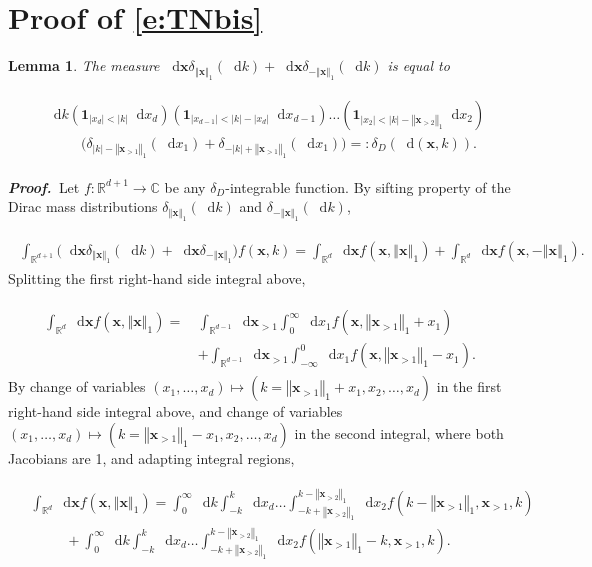 \documentclass[11pt,A4,twoside]{article}
\newcommand\ind{\mathbf{1}}
\numberwithin{equation}{section}
\renewcommand{\b}[1]{{\color{blue}#1}}
\renewcommand{\vec}{\mathbf}
\renewcommand*\d{\mathop{}\!\mathrm{d}}
\newcommand{\norml}[1]{\left\Vert#1 \right\Vert_{1}}
\newcommand{\x}{\mathbf{x}}
\newcommand{\z}{\mathbf{z}}
\newcommand{\R}{\mathbbm{R}}
\def\qqq{\;\;\;\;\;\;\;\;\;}
\newcommand{\beqa}{\begin{eqnarray}}
\newcommand{\eeqa}{\end{eqnarray}}
\def\bal{\begin{aligned}}
\def\eal{\end{aligned}}
\def\bll#1{
\beqa\label{#1}\bal
}\def\lel{\eal\eeqa}
\newcommand{\beql}[1]{\bll{#1}}
\newcommand{\eeql}{\lel}
\newtheorem{lemma}[theorem]{Lemma}
\theoremstyle{definition}
\theoremstyle{remark}
\def\z{\vec z}
\def\R{\mathbb{R}}
\def\proof{\noindent \emph{\textbf{Proof.} $\, $}}
\def\theS{D}
\def\thermi{{\rm i}}%
\begin{document}
  
\section{Proof of \eqref{e:TNbis}}\label{s:disp}




\begin{lemma}\label{l:dsxk}The measure $%
\d \x \delta_{\norml{\x}}(\d k) + \d \x \delta_{-\norml{\x}}(\d k) $ 
is equal to
    \beql{e:dssk0}
    & \d k   (\ind_{|x_d|<|k|}\d x_d)   (\ind_{|x_{d-1}|<|k|-|x_d|} \d x_{d-1})   \dots   (\ind_{|x_{2}|<|k|-\norml{\x_{>2}}}\d x_{2}) 
\\&\qqq\big(\delta_{|k|-\norml{\x_{>1}}}(\d x_1) + \delta_{-|k|+\norml{\x_{>1}}}(\d x_1) \big)=:    \delta_\theS(\d(\x,k))   .
    \eeql
\end{lemma}
\proof Let $f: \R^{d+1} \to \mathbb{C}$
be any $\delta_D$-\thermi  ntegrable function.
By sifting property of the Dirac mass distributions
$\delta_{\norml{\x}}(\d k)$ and  $\delta_{-\norml{\x}}(\d k)$,
\beql{e:dssk1}
    \int_{\R^{d+1}} \big(\d \x \delta_{\norml{\x}}(\d k) + \d \x \delta_{-\norml{\x}}\big)f(\x,k) = \int_{\R^{d}} \d \x f(\x,\norml{\x}) + \int_{\R^{d}} \d \x f(\x,-\norml{\x}).
\eeql
Splitting the first right-hand side integral above,
\beql{e:dssk2}
    \int_{\R^{d}} \d \x f(\x,\norml{\x}) 
    =\, & 
    \int_{\R^{d-1}}\d \x_{>1}\int_0^{\infty}\d x_1 f(\x,\norml{\x_{>1}}+x_1)
    \\
    & + \int_{\R^{d-1}}\d \x_{>1}\int^0_{-\infty} \d x_1 f(\x,\norml{\x_{>1}}-x_1).
\eeql
By change of variables $(x_1,\dots,x_d)\mapsto(k =  \norml{\x_{>1}} + x_1, x_2,\dots,x_{d}) $ in the first right-hand side integral above, and  change of variables $(x_1,\dots,x_d)\mapsto(k =   \norml{\x_{>1}} - x_1, x_2,\dots,x_{d}) $ in the second integral, where both Jacobians are 1, and adapting integral regions,
\beql{e:dssk3}
&\int_{\R^{d}} \d \x f(\x,\norml{\x}) = \int_0^{\infty} \d k \int_{-k}^{k}\d x_d\dots\int_{-k+\norml{\x_{>2}}}^{k-\norml{\x_{>2}}}\d x_{2}f(k-\norml{\x_{>1}}, \x_{>1},k) \\
&\qqq +   \int_0^{\infty} \d k \int_{-k}^{k}\d x_d\dots\int_{-k+\norml{\x_{>2}}}^{k-\norml{\x_{>2}}}\d x_{2}f(\norml{\x_{>1}}-k,\x_{>1},k).
\eeql
\end{document}
